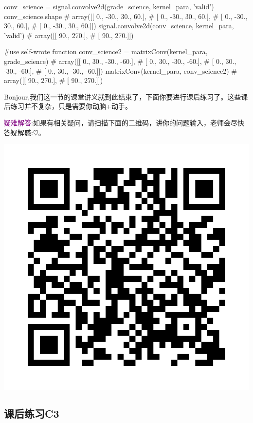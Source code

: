 \documentclass[12pt]{article}
\numberwithin{equation}{section}
\numberwithin{figure}{section}
\begin{document}
\begin{python}
conv_science = signal.convolve2d(grade_science, kernel_para, 'valid')
conv_science.shape
# array([[  0., -30.,  30.,  60.],
#        [  0., -30.,  30.,  60.],
#        [  0., -30.,  30.,  60.],
#        [  0., -30.,  30.,  60.]])
signal.convolve2d(conv_science, kernel_para, 'valid')
# array([[ 90., 270.],
#        [ 90., 270.]])

#use self-wrote function
conv_science2 = matrixConv(kernel_para, grade_science)
# array([[  0.,  30., -30., -60.],
#        [  0.,  30., -30., -60.],
#        [  0.,  30., -30., -60.],
#        [  0.,  30., -30., -60.]])
matrixConv(kernel_para, conv_science2)
# array([[ 90., 270.],
#        [ 90., 270.]])
\end{python}


Bonjour,我们这一节的课堂讲义就到此结束了，下面你要进行课后练习了。这些课后练习并不复杂，只是需要你动脑+动手。

\hfil

\noindent
\textcolor{purple}{疑难解答}:如果有相关疑问，请扫描下面的二维码，讲你的问题输入，老师会尽快答疑解惑:$\heartsuit$。 \begin{marginfigure}
	\centering
	\includegraphics[width=\textwidth]{fig/C3C2qrcode}
\end{marginfigure}


\newpage
\subsection{课后练习C3}
\end{document}

